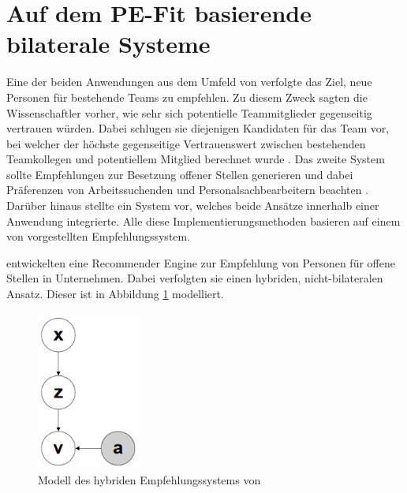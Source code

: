 \section{Auf dem PE-Fit basierende bilaterale Systeme}
\label{ch:verwandteArbeiten:aufDemPEFitBasierendeBilateraleSysteme}
Eine der beiden Anwendungen aus dem Umfeld von \textcite[S. 1ff.]{malinowski:2006} verfolgte das Ziel, neue Personen für bestehende Teams zu empfehlen. Zu diesem Zweck sagten die Wissenschaftler vorher, wie sehr sich potentielle Teammitglieder gegenseitig vertrauen würden. Dabei schlugen sie diejenigen Kandidaten für das Team vor, bei welcher der höchste gegenseitige Vertrauenswert zwischen bestehenden Teamkollegen und potentiellem Mitglied berechnet wurde \cite[S. 5ff.]{keim:2005}\cite[S. 1ff.]{malinowski:2006}. Das zweite System sollte Empfehlungen zur Besetzung offener Stellen generieren und dabei Präferenzen von Arbeitssuchenden und Personalsachbearbeitern beachten \cite[S. 1ff.]{malinowski:2005}. Darüber hinaus stellte \textcite[S. 5ff.]{keim:2007} ein System vor, welches beide Ansätze innerhalb einer Anwendung integrierte. Alle diese Implementierungsmethoden basieren auf einem von \textcite[S. 6ff.]{faerber:2003} vorgestellten Empfehlungssystem.

\textcite[S. 4ff.]{faerber:2003} entwickelten eine Recommender Engine zur Empfehlung von Personen für offene Stellen in Unternehmen. Dabei verfolgten sie einen hybriden, nicht-bilateralen Ansatz. Dieser ist in Abbildung \ref{fig:verwandteArbeiten:abb1} modelliert.

\begin{figure}[h]
	\centering
	\includegraphics[width=0.3\textwidth]{gfx/faerber.png}
	\caption{Modell des hybriden Empfehlungssystems von \textcite[S. 8]{faerber:2003}}
	\label{fig:verwandteArbeiten:abb1}
\end{figure}

